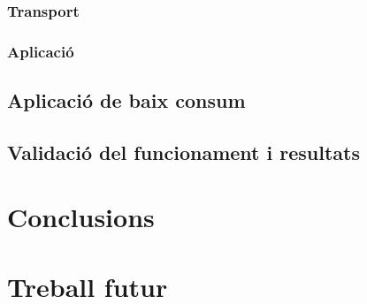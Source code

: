 \documentclass{tfgitic}[2024/07/01]
\begin{document}
\subsection{Transport}
\subsection{Aplicació}
\section{Aplicació de baix consum}
\section{Validació del funcionament i resultats}


\chapter{Conclusions}

\chapter{Treball futur}

\printbibliography

\end{document}
